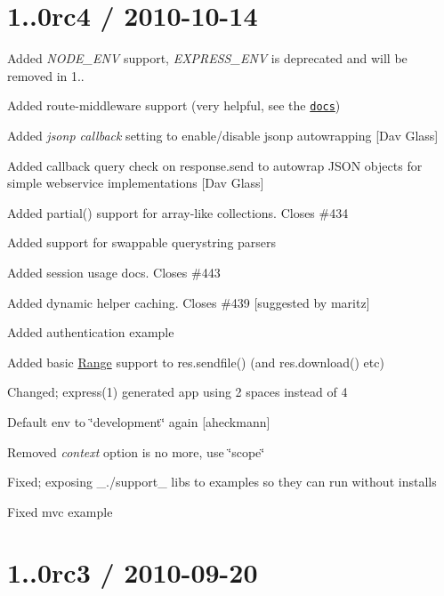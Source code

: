 \section*{1..\+0rc4 / 2010-\/10-\/14 }


\begin{DoxyItemize}
\item Added {\itshape N\+O\+D\+E\+\_\+\+E\+N\+V} support, {\itshape E\+X\+P\+R\+E\+S\+S\+\_\+\+E\+N\+V} is deprecated and will be removed in 1..
\item Added route-\/middleware support (very helpful, see the \href{http://expressjs.com/guide.html#Route-Middleware}{\tt docs})
\item Added {\itshape jsonp callback} setting to enable/disable jsonp autowrapping \mbox{[}Dav Glass\mbox{]}
\item Added callback query check on response.\+send to autowrap J\+S\+O\+N objects for simple webservice implementations \mbox{[}Dav Glass\mbox{]}
\item Added {\ttfamily partial()} support for array-\/like collections. Closes \#434
\item Added support for swappable querystring parsers
\item Added session usage docs. Closes \#443
\item Added dynamic helper caching. Closes \#439 \mbox{[}suggested by maritz\mbox{]}
\item Added authentication example
\item Added basic \hyperlink{struct_range}{Range} support to {\ttfamily res.\+sendfile()} (and {\ttfamily res.\+download()} etc)
\item Changed; {\ttfamily express(1)} generated app using 2 spaces instead of 4
\item Default env to \char`\"{}development\char`\"{} again \mbox{[}aheckmann\mbox{]}
\item Removed {\itshape context} option is no more, use \char`\"{}scope\char`\"{}
\item Fixed; exposing \+\_\+./support\+\_\+ libs to examples so they can run without installs
\item Fixed mvc example
\end{DoxyItemize}

\section*{1..\+0rc3 / 2010-\/09-\/20 }


